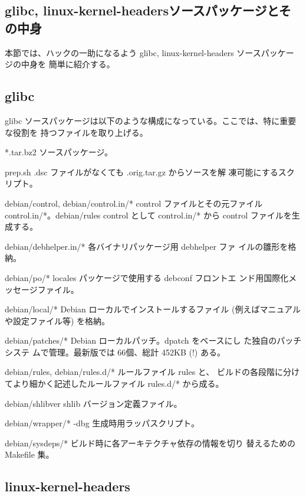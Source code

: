 \documentclass[mingoth,a4paper]{jsarticle}
\newenvironment{gdescription}%
{%
   \begin{list}{}%
   {%
      \setlength{\itemindent}{0mm}
      \setlength{\leftmargin}{45mm}%
      \setlength{\rightmargin}{0zw}%
      \setlength{\labelsep}{4mm}%
      \setlength{\labelwidth}{4cm}%
      \setlength{\itemsep}{0em}%
      \setlength{\parsep}{0cm}%
      \setlength{\listparindent}{0cm}%
      \let\makelabel\gdescriptionlabel
   }
}{%
   \end{list}%
}
\newcommand*\gdescriptionlabel[1]{\hspace\labelsep\normalfont\bfseries #1}
\begin{document}
\subsection{glibc, linux-kernel-headersソースパッケージとその中身}

  本節では、ハックの一助になるよう glibc, linux-kernel-headers ソースパッケージの中身を
  簡単に紹介する。

\subsection{glibc}

  glibc ソースパッケージは以下のような構成になっている。ここでは、特に重要な役割を
  持つファイルを取り上げる。

    \begin{gdescription}
      \item[*.tar.bz2] ソースパッケージ。
      \item[prep.sh] .dsc ファイルがなくても .orig.tar.gz からソースを解
		 凍可能にするスクリプト。
      \item[debian/control, debian/control.in/*] control ファイルとその元ファイル
	control.in/*。debian/rules control として control.in/* から control ファイルを生成する。
      \item[debian/debhelper.in/*] 各バイナリパッケージ用 debhelper ファ
		 イルの雛形を格納。
      \item[debian/po/*] locales パッケージで使用する debconf フロントエ
		 ンド用国際化メッセージファイル。
      \item[debian/local/*] Debian ローカルでインストールするファイル (例えばマニュアルや設定ファイル等) を格納。
      \item[debian/patches/*] Debian ローカルパッチ。dpatch をベースにし
		 た独自のパッチシステ
		 ムで管理。最新版では 66個、総計 452KB (!) ある。
      \item[debian/rules, debian/rules.d/*] ルールファイル rules と、
		 ビルドの各段階に分けてより細かく記述したルールファイル
		 rules.d/* から成る。
      \item[debian/shlibver] shlib バージョン定義ファイル。
      \item[debian/wrapper/*] -dbg 生成時用ラッパスクリプト。
      \item[debian/sysdeps/*] ビルド時に各アーキテクチャ依存の情報を切り
		 替えるための Makefile 集。
    \end{gdescription}

\subsection{linux-kernel-headers}
\end{document}

